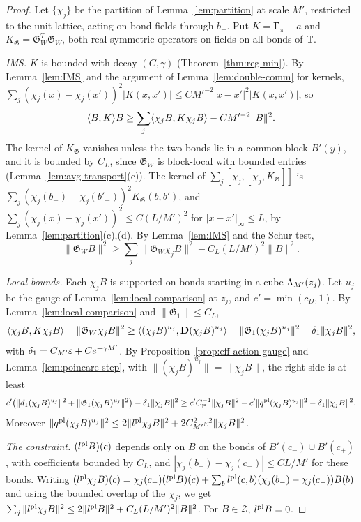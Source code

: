 \begin{proof}
Let $\{\chi_j\}$ be the partition of Lemma~\ref{lem:partition} at scale $M'$, restricted to the unit lattice, acting on bond fields through $b_-$. Put $K=\boldsymbol\Gamma_\pi-a$ and $K_{\mathfrak G}=\mathfrak G_W^T\mathfrak G_W$, both real symmetric operators on fields on all bonds of $\mathbb T$.

\emph{IMS.} $K$ is bounded with decay $(C,\gamma)$ (Theorem~\ref{thm:reg-min}). By Lemma~\ref{lem:IMS} and the argument of Lemma~\ref{lem:double-comm} for kernels, $\sum_j(\chi_j(x)-\chi_j(x'))^2|K(x,x')|\le CM'^{-2}|x-x'|^2|K(x,x')|$, so
\[
\langle B,K\rangle B\ge\sum_j\langle \chi_jB,K\chi_jB\rangle-CM'^{-2}\|B\|^2 .
\]
The kernel of $K_{\mathfrak G}$ vanishes unless the two bonds lie in a common block $B'(y)$, and it is bounded by $C_L$, since $\mathfrak G_W$ is block-local with bounded entries (Lemma~\ref{lem:avg-transport}(c)). The kernel of $\sum_j[\chi_j,[\chi_j,K_{\mathfrak G}]]$ is $\sum_j(\chi_j(b_-)-\chi_j(b'_-))^2K_{\mathfrak G}(b,b')$, and $\sum_j(\chi_j(x)-\chi_j(x'))^2\le C(L/M')^2$ for $|x-x'|_\infty\le L$, by Lemma~\ref{lem:partition}(c),(d). By Lemma~\ref{lem:IMS} and the Schur test,
\[
\|\mathfrak G_WB\|^2\ge\sum_j\|\mathfrak G_W\chi_jB\|^2-C_L(L/M')^2\|B\|^2 .
\]

\emph{Local bounds.} Each $\chi_jB$ is supported on bonds starting in a cube $\Lambda_{M'}(z_j)$. Let $u_j$ be the gauge of Lemma~\ref{lem:local-comparison} at $z_j$, and $c'=\min(c_D,1)$. By Lemma~\ref{lem:local-comparison} and $\|\mathfrak G_1\|\le C_L$,
\[
\langle \chi_jB,K\chi_jB\rangle+\|\mathfrak G_W\chi_jB\|^2\ge\langle (\chi_jB)^{u_j},\mathbf D(\chi_jB)^{u_j}\rangle+\|\mathfrak G_1(\chi_jB)^{u_j}\|^2-\delta_1\|\chi_jB\|^2,
\]
with $\delta_1=C_{M'}\varepsilon+Ce^{-\gamma M'}$. By Proposition~\ref{prop:eff-action-gauge} and Lemma~\ref{lem:poincare-step}, with $\|(\chi_jB)^{u_j}\|=\|\chi_jB\|$, the right side is at least
\[
c'\big(\|d_1(\chi_jB)^{u_j}\|^2+\|\mathfrak G_1(\chi_jB)^{u_j}\|^2\big)-\delta_1\|\chi_jB\|^2\ge c'C_{\rm P}^{-1}\|\chi_jB\|^2-c'\|q^{\rm pl}(\chi_jB)^{u_j}\|^2-\delta_1\|\chi_jB\|^2 .
\]
Moreover $\|q^{\rm pl}(\chi_jB)^{u_j}\|^2\le2\|l^{\rm pl}\chi_jB\|^2+2C_{M'}^2\varepsilon^2\|\chi_jB\|^2$.

\emph{The constraint.} $(l^{\rm pl}B)(c)$ depends only on $B$ on the bonds of $B'(c_-)\cup B'(c_+)$, with coefficients bounded by $C_L$, and $|\chi_j(b_-)-\chi_j(c_-)|\le CL/M'$ for these bonds. Writing $(l^{\rm pl}\chi_jB)(c)=\chi_j(c_-)(l^{\rm pl}B)(c)+\sum_bl^{\rm pl}(c,b)(\chi_j(b_-)-\chi_j(c_-))B(b)$ and using the bounded overlap of the $\chi_j$, we get $\sum_j\|l^{\rm pl}\chi_jB\|^2\le2\|l^{\rm pl}B\|^2+C_L(L/M')^2\|B\|^2$. For $B\in\mathcal Z$, $l^{\rm pl}B=0$.


\end{proof}
